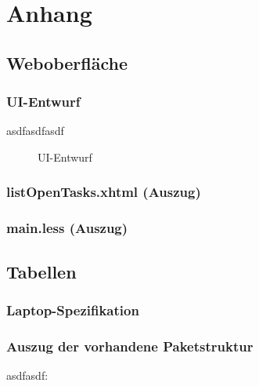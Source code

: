 \appendix
\singlespacing
{}


\section{Anhang}

\subsection{Weboberfläche}
\label{app:Weboberfläche}

\subsubsection{UI-Entwurf}
\label{app:UI-Entwurf}
asdfasdfasdf
\begin{figure}[htb]
    \centering
    \caption{UI-Entwurf}
\end{figure}

\subsubsection{listOpenTasks.xhtml (Auszug)}
\label{app:listOpenTasks}


\clearpage

\subsubsection{main.less (Auszug)}
\label{app:main.less}



\clearpage

\subsection{Tabellen}
\label{Tabellen}

\subsubsection{Laptop-Spezifikation}
\label{app:Laptop-Spezifikation}

\subsubsection{Auszug der vorhandene Paketstruktur}
\label{app:Paketstruktur}
asdfasdf: 

